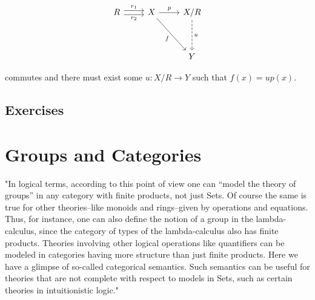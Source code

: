 \documentclass[]{article}
\newcommand{\tfarr}[4][\to]{\ensuremath{#2 : #3 #1 #4}}
\begin{document}
$$\begin{tikzcd}
  R \arrow[shift left=1]{r}{r_1} \arrow[shift right=1,swap]{r}{r_2}  & X
  \arrow[swap]{ddr}{f} \arrow{r}{p} & X/R \arrow[dashed]{dd}{u} \\
  & & \\
  & & Y
\end{tikzcd}$$

commutes and there must exist some \tfarr{u}{X/R}{Y} such that $f(x) = up(x)$.

\subsection{Exercises}



\section{Groups and Categories}

"In logical terms, according to this point of view one can “model the theory of
groups” in any category with finite products, not just Sets. Of course the same
is true for other theories--like monoids and rings--given by operations and
equations. Thus, for instance, one can also define the notion of a group in the
lambda-calculus, since the category of types of the lambda-calculus also has
finite products. Theories involving other logical operations like quantifiers
can be modeled in categories having more structure than just finite products.
Here we have a glimpse of so-called categorical semantics. Such semantics can be
useful for theories that are not complete with respect to models in Sets, such
as certain theories in intuitionistic logic."
\end{document}
